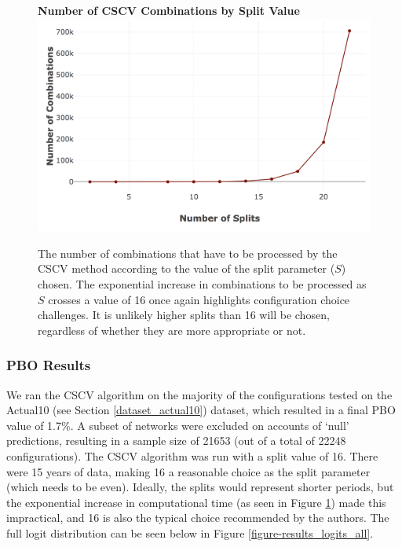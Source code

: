 \documentclass[a4paper,11pt,oneside]{article}
\theoremstyle{plain}
\theoremstyle{definition}
\begin{document}
	\begin{figure}[H]
		\centering 
		\textbf{Number of CSCV Combinations by Split Value}
		\includegraphics[scale=0.4]{images/results/8_9_pbo/combination_sizes.png} 
		\caption[Number of CSCV Combinations by Split Value]{
			\newline The number of combinations that have to be processed by the CSCV method according to the value of the split parameter ($S$) chosen. The exponential increase in combinations to be processed as $S$ crosses a value of 16 once again highlights configuration choice challenges. It is unlikely higher splits than 16 will be chosen, regardless of whether they are more appropriate or not.}
		\label{figure-s_combinations}
	\end{figure}
	
	
	\subsubsection{PBO Results}\label{results_pbo_stats}
	
	We ran the CSCV algorithm on the majority of the configurations tested on the Actual10 (see Section \ref{dataset_actual10}) dataset, which resulted in a final PBO value of 1.7\%. A subset of networks were excluded on accounts of `null' predictions, resulting in a sample size of 21653 (out of a total of 22248 configurations). The CSCV algorithm was run with a split value of 16. There were 15 years of data, making 16 a reasonable choice as the split parameter (which needs to be even). Ideally, the splits would represent shorter periods, but the exponential increase in computational time (as seen in Figure \ref{figure-s_combinations}) made this impractical, and 16 is also the typical choice recommended by the authors. The full logit distribution can be seen below in Figure \ref{figure-results_logits_all}.
	
\end{document}
